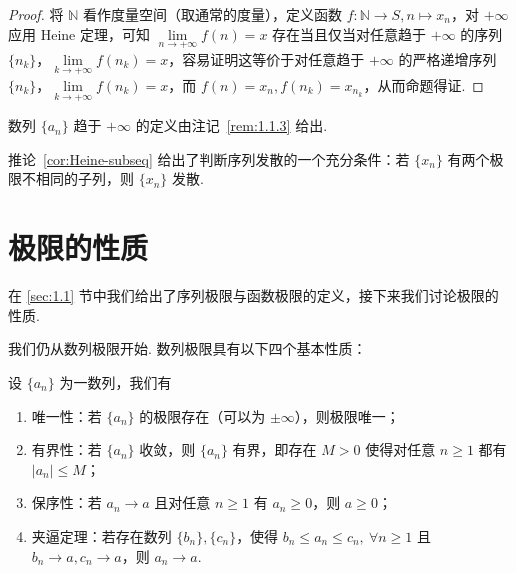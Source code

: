 \documentclass[../main.tex]{subfiles}
\begin{document}
\begin{proof}
    将 $\mathbb N$ 看作度量空间（取通常的度量），定义函数 $f:\mathbb N \to S, n \mapsto x_n$，对 $+\infty$ 应用 Heine 定理，可知 $\lim\limits_{n \to +\infty} f(n) = x$ 存在当且仅当对任意趋于 $+\infty$ 的序列 $\{n_k\}$，$\lim\limits_{k \to +\infty} f(n_k) = x$，容易证明这等价于对任意趋于 $+\infty$ 的严格递增序列 $\{n_k\}$，$\lim\limits_{k \to +\infty} f(n_k) = x$，而 $f(n) = x_n, f(n_k) = x_{n_k}$，从而命题得证. 
\end{proof}

\begin{remark}
    数列 $\{a_n\}$ 趋于 $+\infty$ 的定义由注记~\ref{rem:1.1.3} 给出. 
\end{remark}

推论~\ref{cor:Heine-subseq} 给出了判断序列发散的一个充分条件：若 $\{x_n\}$ 有两个极限不相同的子列，则 $\{x_n\}$ 发散. 



\section{极限的性质} \label{sec:1.2}

在 \ref{sec:1.1} 节中我们给出了序列极限与函数极限的定义，接下来我们讨论极限的性质. 

我们仍从数列极限开始. 数列极限具有以下四个基本性质：

\begin{proposition}[数列极限的基本性质] \label{prop:lim-num-seq}
    设 $\{a_n\}$ 为一数列，我们有
    \begin{enumerate}[label=(\alph*)]
        \item 唯一性：若 $\{a_n\}$ 的极限存在（可以为 $\pm\infty$），则极限唯一；
        \item 有界性：若 $\{a_n\}$ 收敛，则 $\{a_n\}$ 有界，即存在 $M > 0$ 使得对任意 $n \geqslant 1$ 都有 $|a_n| \leqslant M$；
        \item 保序性：若 $a_n \to a$ 且对任意 $n \geqslant 1$ 有 $a_n \geqslant 0$，则 $a \geqslant 0$；
        \item 夹逼定理：若存在数列 $\{b_n\}, \{c_n\}$，使得 $b_n \leqslant a_n \leqslant c_n,\ \forall n \geqslant 1$ 且 $b_n \to a, c_n \to a$，则 $a_n \to a$. 
    \end{enumerate}
\end{proposition}
\end{document}
